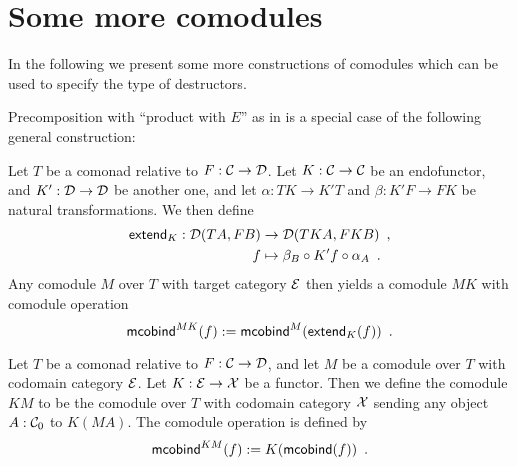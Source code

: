 \documentclass{amsart}
\begin{document}
\section{Some more comodules}

In the following we present some more constructions of comodules which can be used to specify the type of 
destructors.





Precomposition with \enquote{product with $E$} as in  is a special case of the following
general construction:

\begin{definition}
  Let $T$ be a comonad relative to $F:\C\to\D$. 
  Let $K : \C\to\C$ be an endofunctor, and $K' : \D\to\D$ be another one, and let 
  $\alpha : TK \to K'T$ and $\beta : K'F \to FK$ be natural transformations.
  We then define
  \begin{align*} \extend_K : \D(TA,FB) &\to \D(TKA,FKB)  \enspace , \\ 
                                  f  &\mapsto \comp{\alpha_{A}}{\comp{K'f}{\beta_B}}  \enspace .
  \end{align*}
%
  Any comodule $M$ over $T$ with target category $\E$ then yields a comodule $MK$ with comodule operation
  \[ \mcobind^{MK}(f) := \mcobind^M(\extend_K(f)) \enspace . \]
\end{definition}

\begin{definition}\label{def:postcomposition_functor}
  Let $T$ be a comonad relative to $F:\C\to\D$, and let $M$ be a comodule over $T$ with codomain category $\E$.
 Let $K : \E \to \X$ be a functor. Then we define the comodule $KM$ to be the comodule over $T$ with codomain category $\X$
  sending any object $A:\C_0$ to $K(MA)$.
  The comodule operation is defined by
  \[ \mcobind^{KM}(f) := K (\mcobind(f)) \enspace . 
  \]
\end{definition}
\end{document}
